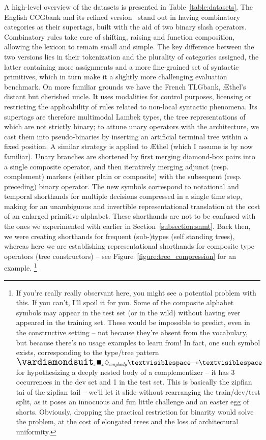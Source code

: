 A high-level overview of the datasets is presented in Table~\ref{table:datasets}.
The English CCGbank and its refined version~\cite[rebank]{honnibal2010rebanking} stand out in having combinatory categories as their supertags, built with the aid of two binary slash operators.
Combinatory rules take care of shifting, raising and function composition, allowing the lexicon to remain small and simple.
The key difference between the two versions lies in their tokenization and the plurality of categories assigned, the latter containing more assignments and a more fine-grained set of syntactic primitives, which in turn make it a slightly more challenging evaluation benchmark.
On more familiar grounds we have the French TLGbank, \AE thel's distant but cherished uncle. 
It uses modalities for control purposes, licensing or restricting the applicability of rules related to non-local syntactic phenomena.
Its supertags are therefore multimodal Lambek types, the tree representations of which are not strictly binary; to attune unary operators with the architecture, we cast them into pseudo-binaries by inserting an artificial terminal tree within a fixed position.
A similar strategy is applied to \AE thel (which I assume is by now familiar).
Unary branches are shortened by first merging diamond-box pairs into a single composite operator, and then iteratively merging adjunct (resp. complement) markers (either plain or composite) with the subsequent (resp. preceding) binary operator.
The new symbols correspond to notational and temporal shorthands for multiple decisions compressed in a single time step, making for an unambiguous and invertible representational translation at the cost of an enlarged primitive alphabet.
These shorthands are not to be confused with the ones we experimented with earlier in Section~\ref{subsection:snmt}.
Back then, we were creating shorthands for frequent (sub-)types (self standing trees), whereas here we are establishing representational shorthands for composite type operators (tree constructors) -- see Figure~\ref{figure:tree_compression} for an example.%
	\footnote{If you're really really observant here, you might see a potential problem with this. 
	If you can't, I'll spoil it for you.
	Some of the composite alphabet symbols may appear in the test set (or in the wild) without having ever appeared in the training set.
	These would be impossible to predict, even in the constructive setting -- not because they're absent from the vocabulary, but because there's no usage examples to learn from!
	In fact, one such symbol exists, corresponding to the type/tree pattern $\dxdia{x}\dxbox{x}\ddia{cmpbody} \textvisiblespace \li \textvisiblespace$ for hypothesizing a deeply nested body of a complementizer -- it has 3 occurrences in the dev set and 1 in the test set.
	This is basically the zipfian tai of the zipfian tail -- we'll let it slide without rearranging the train/dev/test split, as it poses an innocuous and fun little challenge and an easter egg of shorts.
	Obviously, dropping the practical restriction for binarity would solve the problem, at the cost of elongated trees and the loss of architectural uniformity.}

